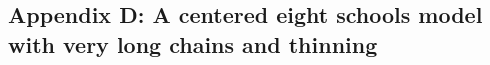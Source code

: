 \documentclass[american,]{article}
\let\oldparagraph\paragraph
\renewcommand{\paragraph}[1]{\oldparagraph{#1}\mbox{}}
\begin{document}







\hypertarget{a-centered-eight-schools-model-1}{%
\subsection*{Appendix D: A centered eight schools model with very long chains and
thinning}\label{a-centered-eight-schools-model-1}}

\end{document}
